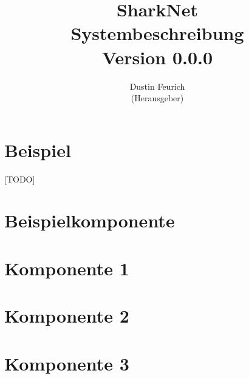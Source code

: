\documentclass[german]{book}
\begin{document}
\title{SharkNet\\
Systembeschreibung \\
Version 0.0.0
}

\author{Dustin Feurich \\
(Herausgeber)
}

\maketitle

\tableofcontents

\chapter{Beispiel}
[TODO]

\chapter{Beispielkomponente}


\chapter{Komponente 1}
%

\chapter{Komponente 2}
%

\chapter{Komponente 3}
%
\end{document}
